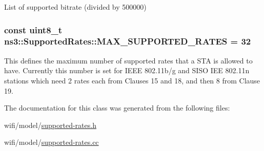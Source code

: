 List of supported bitrate (divided by 500000) 

\subsubsection[{\texorpdfstring{M\+A\+X\+\_\+\+S\+U\+P\+P\+O\+R\+T\+E\+D\+\_\+\+R\+A\+T\+ES}{MAX_SUPPORTED_RATES}}]{\setlength{\rightskip}{0pt plus 5cm}const uint8\+\_\+t ns3\+::\+Supported\+Rates\+::\+M\+A\+X\+\_\+\+S\+U\+P\+P\+O\+R\+T\+E\+D\+\_\+\+R\+A\+T\+ES = 32\hspace{0.3cm}{\ttfamily [static]}}\hypertarget{classns3_1_1SupportedRates_ac9bc5778c688e7b70f17dc4536de3922}{}\label{classns3_1_1SupportedRates_ac9bc5778c688e7b70f17dc4536de3922}
This defines the maximum number of supported rates that a S\+TA is allowed to have. Currently this number is set for I\+E\+EE 802.\+11b/g and S\+I\+SO I\+EE 802.\+11n stations which need 2 rates each from Clauses 15 and 18, and then 8 from Clause 19. 

The documentation for this class was generated from the following files\+:\begin{DoxyCompactItemize}
\item 
wifi/model/\hyperlink{supported-rates_8h}{supported-\/rates.\+h}\item 
wifi/model/\hyperlink{supported-rates_8cc}{supported-\/rates.\+cc}\end{DoxyCompactItemize}
